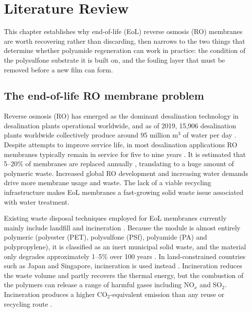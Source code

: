 \chapter{Literature Review}
\label{ch:literature_review}


This chapter establishes why end-of-life (EoL) reverse osmosis (RO) membranes are worth recovering rather than discarding, then narrows to the two things that determine whether polyamide regeneration can work in practice: the condition of the polysulfone substrate it is built on, and the fouling layer that must be removed before a new film can form.


\section{The end-of-life RO membrane problem}
\label{sec:eol-problem}
\label{sec:eol-routes}

Reverse osmosis (RO) has emerged as the dominant desalination technology in desalination plants operational worldwide, and as of 2019, 15,906 desalination plants worldwide collectively produce around 95 million $\mathrm{m^3}$ of water per day \citep{Jones2019}. Despite attempts to improve service life, in most desalination applications RO membranes typically remain in service for five to nine years \citep{Ding_2026, Lawler2015}. It is estimated that 5--20\% of membranes are replaced annually \citep{BerattoRamos2024, imdea2018transfomem, Guclu2022}, translating to a huge amount of polymeric waste. Increased global RO development and increasing water demands drive more membrane usage and waste. The lack of a viable recycling infrastructure makes EoL membranes a fast-growing solid waste issue associated with water treatment.

Existing waste disposal techniques employed for EoL membranes currently mainly include landfill and incineration \citep{Khanzada2024}. Because the module is almost entirely polymeric (polyester (PET), polysulfone (PSf), polyamide (PA) and polypropylene), it is classified as an inert municipal solid waste, and the material only degrades approximately 1--5\% over 100 years \citep{Lawler2015}. In land-constrained countries such as Japan and Singapore, incineration is used instead \citep{Lawler2015}. Incineration reduces the waste volume and partly recovers the thermal energy, but the combustion of the polymers can release a range of harmful gases including NO$_x$ and SO$_2$. Incineration produces a higher CO$_2$-equivalent emission than any reuse or recycling route \citep{Lawler2015}.

